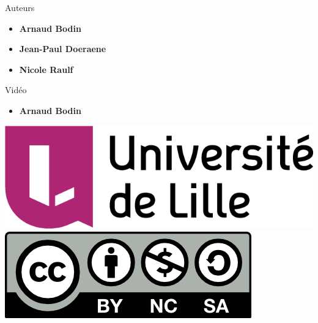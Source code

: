 








\begin{frame}

\thispagestyle{empty}    

  \vspace*{-0cm}
  
  \hfill
  \begin{minipage}{0.4\textwidth}
  Auteurs
  \begin{itemize}
    \item {\bf Arnaud Bodin}
    \item {\bf Jean-Paul Doeraene}
    \item {\bf Nicole Raulf}
  \end{itemize}
  Vidéo 
  \begin{itemize}
    \item {\bf Arnaud Bodin}
  \end{itemize}
  \end{minipage}  

\vfill


   \hfil
   \hspace*{1cm}
   \includegraphics[scale=0.13]{Logo-Univ-Lille} 
   \hfil   
   \hfil
   \includegraphics[scale=0.5]{by-nc-sa.png}



\end{frame}


